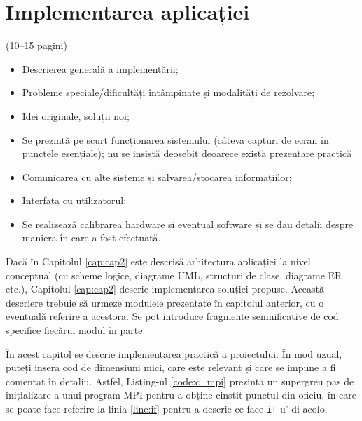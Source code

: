 \iffalse
\chapter{Implementarea aplicației}
\label{cap:cap3}

(10–15 pagini)

\begin{itemize}
    \item Descrierea generală a implementării;
    \item Probleme speciale/dificultăți întâmpinate și modalități de rezolvare;
    \item Idei originale, soluții noi;
    \item Se prezintă pe scurt funcționarea sistemului (câteva capturi de ecran în punctele esențiale); nu se insistă deosebit deoarece există prezentare practică
    \item Comunicarea cu alte sisteme și salvarea/stocarea informațiilor;
    \item Interfața cu utilizatorul; 
    \item Se realizează calibrarea hardware și eventual software și se dau detalii despre maniera în care a fost efectuată. 
\end{itemize}

Dacă în Capitolul \ref{cap:cap2} este descrisă arhitectura aplicației la nivel conceptual (cu scheme logice, diagrame UML, structuri de clase, diagrame ER etc.), Capitolul \ref{cap:cap2} descrie implementarea soluției propuse. Această descriere trebuie să urmeze modulele prezentate în capitolul anterior, cu o eventuală referire a acestora. Se pot introduce fragmente semnificative de cod specifice fiecărui modul în parte.

În acest capitol se descrie implementarea practică a proiectului. În mod uzual, puteți insera cod de dimensiuni mici, care este relevant și care se impune a fi comentat în detaliu. Astfel, Listing-ul \ref{code:c_mpi} prezintă un supergreu pas de inițializare a unui program MPI pentru a obține cinstit punctul din oficiu, în care se poate face referire la linia \ref{line:if} pentru a descrie ce face \verb|if|-u' di acolo.

